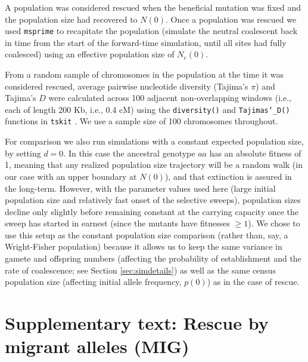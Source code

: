 \documentclass[]{article}
\begin{document}
A population was considered rescued when the beneficial mutation was fixed and the population size had recovered to $N(0)$.
Once a population was rescued we used \texttt{msprime} \citep{kelleher2016efficient} to recapitate the population (simulate the neutral coalescent back in time from the start of the forward-time simulation, until all sites had fully coalesced) using an effective population size of $N_e(0)$.

From a random sample of chromosomes in the population at the time it was considered rescued, average pairwise nucleotide diversity (Tajima's $\pi$) and Tajima's $D$ were calculated across 100 adjacent non-overlapping windows (i.e., each of length 200 Kb, i.e., 0.4 cM) using the \texttt{diversity()} and \texttt{Tajimas\char`_D()} functions in \texttt{tskit} \cite[][]{kelleher2018efficient}.
We use a sample size of 100 chromosomes throughout.
 
For comparison we also run simulations with a constant expected population size, by setting $d=0$.
In this case the ancestral genotype $aa$ has an absolute fitness of 1, meaning that any realized population size trajectory will be a random walk (in our case with an upper boundary at $N(0)$), and that extinction is assured in the long-term.  
However, with the parameter values used here (large initial population size and relatively fast onset of the selective sweeps), population sizes decline only slightly before remaining constant at the carrying capacity once the sweep has started in earnest (since the mutants have fitnesses $\geq 1$).
We chose to use this setup as the constant population size comparison (rather than, say, a Wright-Fisher population) because it allows us to keep the same variance in gamete and offspring numbers (affecting the probability of establishment and the rate of coalescence; see Section \ref{sec:simdetails}) as well as the same census population size (affecting initial allele frequency, $p(0)$) as in the case of rescue.

\section*{Supplementary text: Rescue by migrant alleles (MIG)}
\label{sec:rescue_forward_mig}
\end{document}
